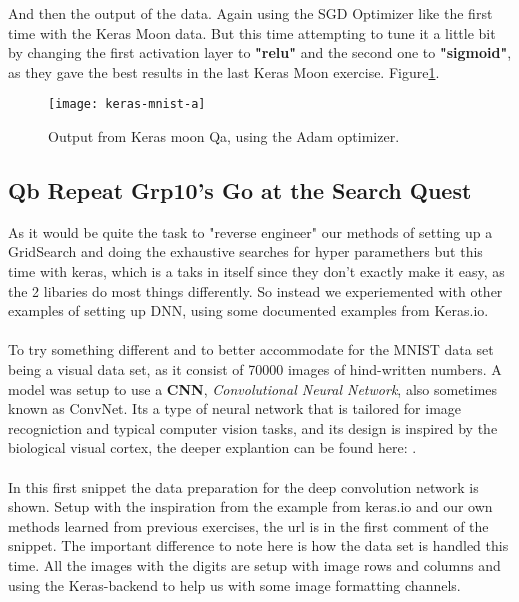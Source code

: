 \documentclass{article}
\begin{document}
\noindent
And then the output of the data. Again using the SGD Optimizer like the first time with the Keras Moon data. But this time attempting to tune it a little bit by changing the first activation layer to \textbf{"relu"} and the second one to \textbf{"sigmoid"}, as they gave the best results in the last Keras Moon exercise. Figure\ref{fig:keras-mnist-a}.

\begin{figure}[H]
  \centering
    \texttt{[image: keras-mnist-a]}
    \caption{Output from Keras moon Qa, using the Adam optimizer.}
    \label{fig:keras-mnist-a}
\end{figure}

\subsection{Qb Repeat Grp10's Go at the Search Quest}
As it would be quite the task to "reverse engineer" our methods of setting up a GridSearch and doing the exhaustive searches for hyper paramethers but this time with keras, which is a taks in itself since they don't exactly make it easy, as the 2 libaries do most things differently. So instead we experiemented with other examples of setting up DNN, using some documented examples from Keras.io.
\\ \\
To try something different and to better accommodate for the MNIST data set being a visual data set, as it consist of 70000 images of hind-written numbers. A model was setup to use a \textbf{CNN}, \textit{Convolutional Neural Network}, also sometimes known as ConvNet. Its a type of neural network that is tailored for image recogniction and typical computer vision tasks, and its design is inspired by the biological visual cortex, the deeper explantion can be found here: \href{http://libccv.org/doc/doc-convnet/}{}. 
\\ \\
In this first snippet the data preparation for the deep convolution network is  shown. Setup with the inspiration from the example from keras.io and our own methods learned from previous exercises, the url is in the first comment of the snippet. The important difference to note here is how the data set is handled this time. All the images with the digits are setup with image rows and columns and using the Keras-backend to help us with some image formatting channels.
\end{document}
